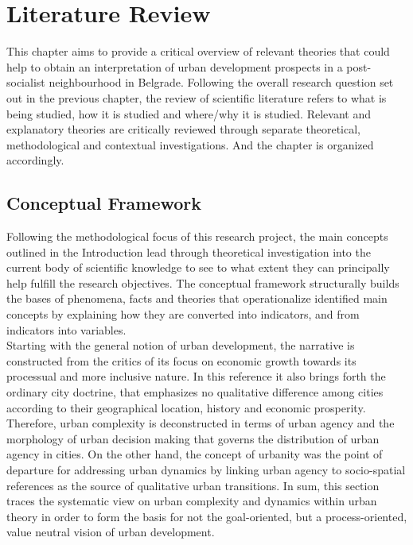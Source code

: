 \documentclass[11pt]{report}
\begin{document}

\chapter{Literature Review}


This chapter aims to provide a critical overview of relevant theories that could help to obtain an interpretation of urban development prospects in a post-socialist neighbourhood in Belgrade.
Following the overall research question set out in the previous chapter, the review of scientific literature refers to what is being studied, how it is studied and where/why it is studied. 
Relevant and explanatory theories are critically reviewed through separate theoretical, methodological and contextual investigations.
And the chapter is organized accordingly.

\section{Conceptual Framework}

Following the methodological focus of this research project, the main concepts outlined in the Introduction lead through theoretical investigation into the current body of scientific knowledge 
to see to what extent they can principally help fulfill the research objectives. 
The conceptual framework structurally builds the bases of phenomena, facts and theories that operationalize identified main concepts by explaining how they are converted into indicators, and from indicators into variables.
\\
Starting with the general notion of urban development, the narrative is constructed from the critics of its focus on economic growth towards its processual and more inclusive nature.
In this reference it also brings forth the ordinary city doctrine, that emphasizes no qualitative difference among cities according to their geographical location, history and economic prosperity.
Therefore, urban complexity is deconstructed in terms of urban agency and the morphology of urban decision making that governs the distribution of urban agency in cities.
On the other hand, the concept of urbanity was the point of departure for addressing urban dynamics by linking urban agency to socio-spatial references as the source of qualitative urban transitions.
In sum, this section traces the systematic view on urban complexity and dynamics within urban theory in order to form the basis for not the goal-oriented, but a process-oriented, value neutral vision of urban development.
\end{document}
